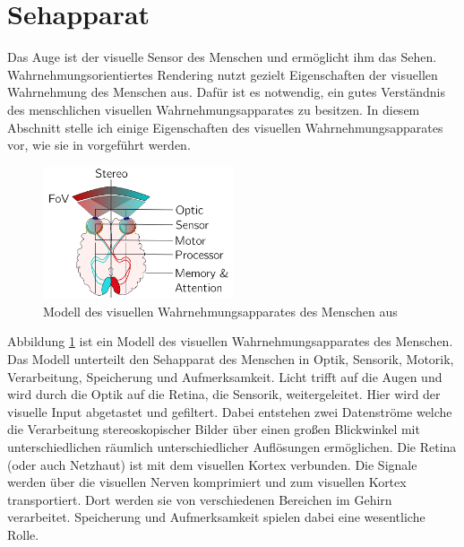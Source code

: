 \section{Sehapparat}\label{sec::eye}
Das Auge ist der visuelle Sensor des Menschen und ermöglicht ihm das Sehen.
Wahrnehmungsorientiertes Rendering nutzt gezielt Eigenschaften der visuellen Wahrnehmung des Menschen aus.
Dafür ist es notwendig, ein gutes Verständnis des menschlichen visuellen Wahrnehmungsapparates zu besitzen.
In diesem Abschnitt stelle ich einige Eigenschaften des visuellen Wahrnehmungsapparates vor, wie sie in \cite{doi:10.1111/cgf.13150} vorgeführt werden.
\begin{figure}
	\centering
	\includegraphics[width=0.5\textwidth]{../../Grafiken/HVS-model_from-star-report.png}
	\caption{Modell des visuellen Wahrnehmungsapparates des Menschen aus \cite{doi:10.1111/cfg.13150}}
	\label{fig::eye01}
\end{figure}
Abbildung \ref{fig::eye01} ist ein Modell des visuellen Wahrnehmungsapparates des Menschen.
Das Modell unterteilt den Sehapparat des Menschen in Optik, Sensorik, Motorik, Verarbeitung, Speicherung und Aufmerksamkeit.
Licht trifft auf die Augen und wird durch die Optik auf die Retina, die Sensorik, weitergeleitet.
Hier wird der visuelle Input abgetastet und gefiltert.
Dabei entstehen zwei Datenströme welche die Verarbeitung stereoskopischer Bilder über einen großen Blickwinkel mit unterschiedlichen räumlich unterschiedlicher Auflösungen ermöglichen.
Die Retina (oder auch Netzhaut) ist mit dem visuellen Kortex verbunden.
Die Signale werden über die visuellen Nerven komprimiert und zum visuellen Kortex transportiert.
Dort werden sie von verschiedenen Bereichen im Gehirn verarbeitet.
Speicherung und Aufmerksamkeit spielen dabei eine wesentliche Rolle.

